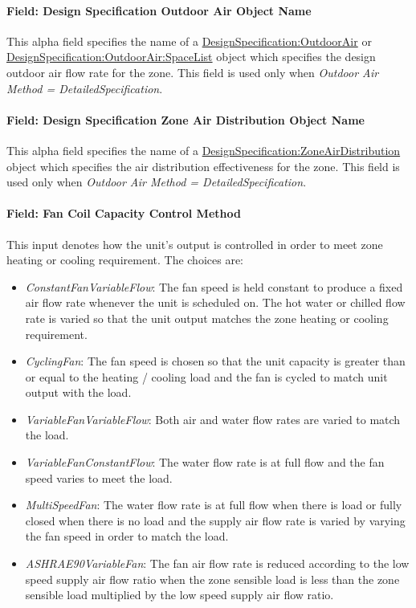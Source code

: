 \paragraph{Field: Design Specification Outdoor Air Object Name}\label{field-design-specification-outdoor-air-object-name-2-000}

This alpha field specifies the name of a \hyperref[designspecificationoutdoorair]{DesignSpecification:OutdoorAir} or \hyperref[designspecificationoutdoorairspacelist]{DesignSpecification:OutdoorAir:SpaceList} object which specifies the design outdoor air flow rate for the zone. This field is used only when \emph{Outdoor Air Method = DetailedSpecification}.

\paragraph{Field: Design Specification Zone Air Distribution Object Name}\label{field-design-specification-zone-air-distribution-object-name-1}

This alpha field specifies the name of a \hyperref[designspecificationzoneairdistribution]{DesignSpecification:ZoneAirDistribution} object which specifies the air distribution effectiveness for the zone. This field is used only when \emph{Outdoor Air Method = DetailedSpecification}.

\paragraph{Field: Fan Coil Capacity Control Method}\label{field-fan-coil-capacity-control-method}

This input denotes how the unit's output is controlled in order to meet zone heating or cooling requirement. The choices are:
\begin{itemize}
\item
  \emph{ConstantFanVariableFlow}: The fan speed is held constant to produce a fixed air flow rate whenever the unit is scheduled on. The hot water or chilled flow rate is varied so that the unit output matches the zone heating or cooling requirement.
\item
  \emph{CyclingFan}: The fan speed is chosen so that the unit capacity is greater than or equal to the heating / cooling load and the fan is cycled to match unit output with the load.
\item
  \emph{VariableFanVariableFlow}: Both air and water flow rates are varied to match the load.
\item
  \emph{VariableFanConstantFlow}: The water flow rate is at full flow and the fan speed varies to meet the load.
\item
  \emph{MultiSpeedFan}: The water flow rate is at full flow when there is load or fully closed when there is no load and the supply air flow rate is varied by varying the fan speed in order to match the load.
\item
  \emph{ASHRAE90VariableFan}: The fan air flow rate is reduced according to the low speed supply air flow ratio when the zone sensible load is less than the zone sensible load multiplied by the low speed supply air flow ratio.
\end{itemize}

